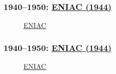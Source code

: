 \documentclass[ignorenonframetext, hyperref=unicode]{beamer}
\begin{document}
\begin{frame}
\frametitle{1940--1950: 
\href{http://en.wikipedia.org/wiki/ENIAC}{ENIAC (1944)}}
\begin{figure}[h]
\center
{}
\caption{\href{http://en.wikipedia.org/wiki/Image:Eniac.jpg}{ENIAC}}
\end{figure}
\end{frame}

\begin{frame}
\frametitle{1940--1950: 
\href{http://en.wikipedia.org/wiki/ENIAC}{ENIAC (1944)}}
\begin{figure}[h]
\center
{}
\caption{\href{http://en.wikipedia.org/wiki/Image:Two_women_operating_ENIAC.gif}{ENIAC}}
\end{figure}
\end{frame}
\end{document}
